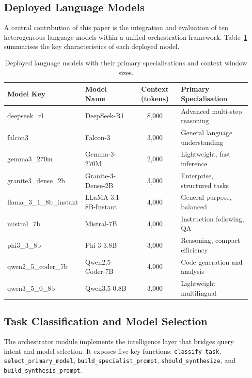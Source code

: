 \documentclass[12pt,a4paper]{article}
\begin{document}
\subsection{Deployed Language Models}

A central contribution of this paper is the integration and evaluation of ten heterogeneous language models within a unified orchestration framework. Table~\ref{tab:models} summarises the key characteristics of each deployed model.

\begin{table}[htbp]
\centering
\caption{Deployed language models with their primary specialisations and context window sizes.}
\label{tab:models}
\begin{tabular}{|l|l|c|p{3.5cm}|}
\hline
\textbf{Model Key} & \textbf{Model Name} & \textbf{Context (tokens)} & \textbf{Primary Specialisation} \\
\hline
deepseek\_r1 & DeepSeek-R1 & 8,000 & Advanced multi-step reasoning \\
\hline
falcon3 & Falcon-3 & 3,000 & General language understanding \\
\hline
gemma3\_270m & Gemma-3-270M & 2,000 & Lightweight, fast inference \\
\hline
granite3\_dense\_2b & Granite-3-Dense-2B & 3,000 & Enterprise, structured tasks \\
\hline
llama\_3\_1\_8b\_instant & LLaMA-3.1-8B-Instant & 4,000 & General-purpose, balanced \\
\hline
mistral\_7b & Mistral-7B & 4,000 & Instruction following, QA \\
\hline
phi3\_3\_8b & Phi-3-3.8B & 3,000 & Reasoning, compact efficiency \\
\hline
qwen2\_5\_coder\_7b & Qwen2.5-Coder-7B & 4,000 & Code generation and analysis \\
\hline
qwen3\_5\_0\_8b & Qwen3.5-0.8B & 3,000 & Lightweight multilingual \\
\hline
\end{tabular}
\end{table}

\subsection{Task Classification and Model Selection}

The orchestrator module implements the intelligence layer that bridges query intent and model selection. It exposes five key functions: \texttt{classify\_task}, \texttt{select\_primary\_model}, \texttt{build\_specialist\_prompt}, \texttt{should\_synthesize}, and \texttt{build\_synthesis\_prompt}.
\end{document}
